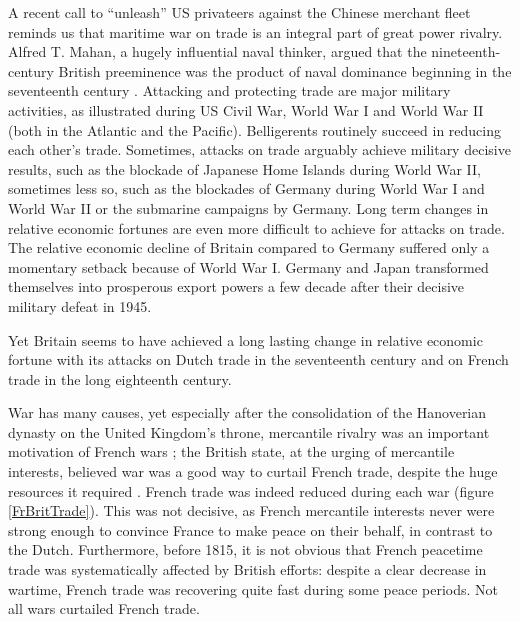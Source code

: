 \documentclass[12pt,a4paper,notitlepage,english]{article}
\begin{document}
A recent call to ``unleash'' US privateers against the Chinese merchant fleet \citep{Cancian2020} reminds us that maritime war on trade is an integral part of great power rivalry.
Alfred T. Mahan, a hugely influential naval thinker, argued that the nineteenth-century British preeminence was the product of naval dominance beginning in the seventeenth century \citep{Mahan2004,Mahan2016,Mahan2016a}.
Attacking and protecting trade are major military activities, as illustrated during US Civil War, World War I and World War II (both in the Atlantic and the Pacific).
Belligerents routinely succeed in reducing each other's trade.
Sometimes, attacks on trade arguably achieve military decisive results, such as the blockade of Japanese Home Islands during World War II, sometimes less so, such as the blockades of Germany during World War I and World War II or the submarine campaigns by Germany.
Long term changes in relative economic fortunes are even more difficult to achieve for attacks on trade.
The relative economic decline of Britain compared to Germany suffered only a momentary setback because of World War I.
Germany and Japan transformed themselves into prosperous export powers a few decade after their decisive military defeat in 1945.

Yet Britain seems to have achieved a long lasting change in relative economic fortune with its attacks on Dutch trade in the seventeenth century and on French trade in the long eighteenth century.

War has many causes, yet especially after the consolidation of the Hanoverian dynasty on the United Kingdom’s throne, mercantile rivalry was an important motivation of French wars \citep{Wallerstein1980, Tracy1991, Davis2006, Crouzet2008}; the British state, at the urging of mercantile interests, believed war was a good way to curtail French trade, despite the huge resources it required \citep{Baugh1965, Neal1977, Brewer2002}.
French trade was indeed reduced during each war (figure \ref{FrBritTrade}).
This was not decisive, as French mercantile interests never were strong enough to convince France to make peace on their behalf, in contrast to the Dutch.
Furthermore, before 1815, it is not obvious that French peacetime trade was systematically affected by British efforts: despite a clear decrease in wartime, French trade was recovering quite fast during some peace periods.
Not all wars curtailed French trade.
\end{document}
